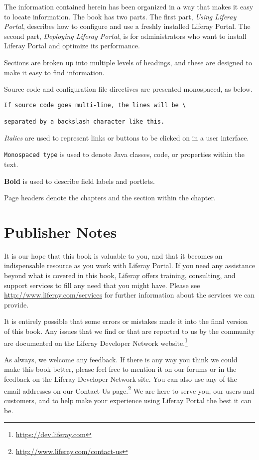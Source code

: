 \documentclass[9pt,openright,twoside]{memoir}
\begin{document}
The information contained herein has been organized in a way that makes it easy
to locate information. The book has two parts. The first part, 
\textit{Using Liferay Portal}, describes how to configure and use a freshly 
installed Liferay Portal. The second part, \textit{Deploying Liferay Portal}, 
is for administrators who want to install Liferay Portal and optimize its 
performance. 

Sections are broken up into multiple levels of headings, and these are
designed to make it easy to find information.

Source code and configuration file directives are presented monospaced, as
below.

\begin{verbatim}
If source code goes multi-line, the lines will be \

separated by a backslash character like this.

\end{verbatim}

\textit{Italics} are used to represent links or buttons to be clicked on in a
user interface.

\texttt{Monospaced type} is used to denote Java classes, code, or properties
within the text.

\textbf{Bold} is used to describe field labels and portlets.

Page headers denote the chapters and the section within the chapter.

\section{Publisher Notes}

It is our hope that this book is valuable to you, and that it becomes an
indispensable resource as you work with Liferay Portal. If you need any
assistance beyond what is covered in this book, Liferay offers training,
consulting, and support services to fill any need that you might have. Please
see \href{http://www.liferay.com/services}{http://www.liferay.com/services} for
further information about the services we can provide.

It is entirely possible that some errors or mistakes made it into the final
version of this book. Any issues that we find or that are reported to us by the
community are documented on the Liferay Developer Network website.\footnote{\href{https://dev.liferay.com}{https://dev.liferay.com}} 

As always, we welcome any feedback. If there is any way you think we
could make this book better, please feel free to mention it on our
forums or in the feedback on the Liferay Developer Network site. You can also
use any of the email addresses on our Contact Us
page.\footnote{\href{http://www.liferay.com/contact-us}{http://www.liferay.com/contact-us}}
We are here to serve you, our users and customers, and to help make your
experience using Liferay Portal the best it can be.

\mainmatter

\pagestyle{headings}
\end{document}
